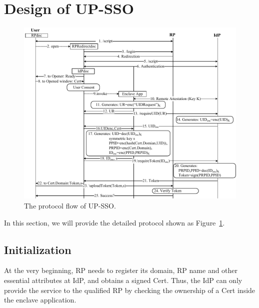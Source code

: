 \section{Design of UP-SSO}
\label{sec:design}
\begin{figure}[t!]
  \centering
  \includegraphics[width=0.8\linewidth]{fig/sgx-sso.pdf}
  \caption{The protocol flow of UP-SSO.}
  \vspace{-5mm}
  \label{fig:UP-SSO}
\end{figure}

In this section, we will provide the detailed protocol shown as Figure~\ref{fig:UP-SSO}.

\subsection{Initialization}
At the very beginning, RP needs to register its domain, RP name and other essential attributes at IdP, and obtains a signed Cert.  Thus, the  IdP can only provide the service to the qualified RP by checking the ownership of a Cert inside the enclave application.

